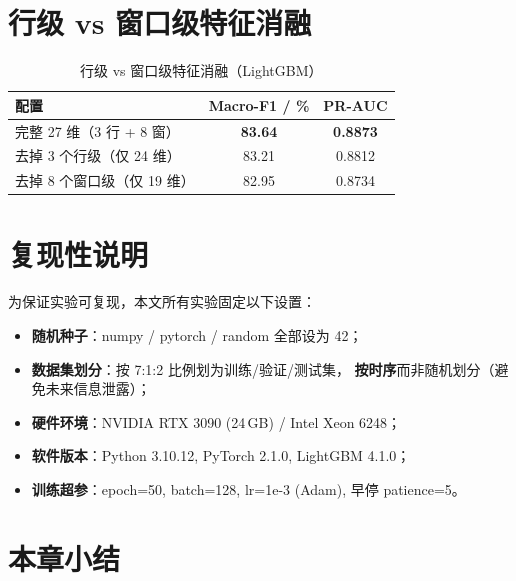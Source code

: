 \section{行级 vs 窗口级特征消融}
\label{sec:feat_ablation}


\begin{table}[H]
\centering
\caption{行级 vs 窗口级特征消融（LightGBM）}
\label{tab:feat_ablation}
\begin{tabular}{lcc}
\toprule
配置 & Macro-F1 / \% & PR-AUC \\
\midrule
完整 27 维（3 行 + 8 窗） & \textbf{83.64} & \textbf{0.8873} \\
去掉 3 个行级（仅 24 维）   & 83.21 & 0.8812 \\
去掉 8 个窗口级（仅 19 维） & 82.95 & 0.8734 \\
\bottomrule
\end{tabular}
\end{table}


\section{复现性说明}
\label{sec:feat_reproduce}


\par 为保证实验可复现，本文所有实验固定以下设置：
\begin{itemize}
  \item \textbf{随机种子}：numpy / pytorch / random 全部设为 42；
  \item \textbf{数据集划分}：按 7:1:2 比例划为训练/验证/测试集，
        \textbf{按时序}而非随机划分（避免未来信息泄露）；
  \item \textbf{硬件环境}：NVIDIA RTX 3090 (24\,GB) / Intel Xeon 6248；
  \item \textbf{软件版本}：Python 3.10.12, PyTorch 2.1.0, LightGBM 4.1.0；
  \item \textbf{训练超参}：epoch=50, batch=128, lr=1e-3 (Adam), 早停 patience=5。
\end{itemize}

\section{本章小结}
\label{sec:feat_summary}


